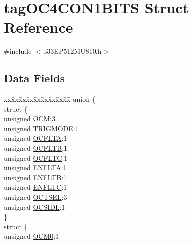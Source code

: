 \hypertarget{structtag_o_c4_c_o_n1_b_i_t_s}{}\section{tag\+O\+C4\+C\+O\+N1\+B\+I\+TS Struct Reference}
\label{structtag_o_c4_c_o_n1_b_i_t_s}


{\ttfamily \#include $<$p33\+E\+P512\+M\+U810.\+h$>$}

\subsection*{Data Fields}
\begin{DoxyCompactItemize}
\item 
\begin{tabbing}
xx\=xx\=xx\=xx\=xx\=xx\=xx\=xx\=xx\=\kill
union \{\\
\>struct \{\\
\>\>unsigned \hyperlink{structtag_o_c4_c_o_n1_b_i_t_s_a778fa0cf51a9477ac4e82d71a8733801}{OCM}:3\\
\>\>unsigned \hyperlink{structtag_o_c4_c_o_n1_b_i_t_s_a7a0057e0dca6e2663584b5b9e1da04c3}{TRIGMODE}:1\\
\>\>unsigned \hyperlink{structtag_o_c4_c_o_n1_b_i_t_s_acc967e41cecdeedc6ad4422f9ef1a6a3}{OCFLTA}:1\\
\>\>unsigned \hyperlink{structtag_o_c4_c_o_n1_b_i_t_s_a1fb30bb4421ef7c4bd0c66c379875593}{OCFLTB}:1\\
\>\>unsigned \hyperlink{structtag_o_c4_c_o_n1_b_i_t_s_a69a1772a4144abd579d17d28445b9934}{OCFLTC}:1\\
\>\>unsigned \hyperlink{structtag_o_c4_c_o_n1_b_i_t_s_a1e0f05fb23d516e003e4713fe8c1498a}{ENFLTA}:1\\
\>\>unsigned \hyperlink{structtag_o_c4_c_o_n1_b_i_t_s_a9d7aa97d5328b8b81ab7fd9145dfa0fc}{ENFLTB}:1\\
\>\>unsigned \hyperlink{structtag_o_c4_c_o_n1_b_i_t_s_a0b6f25c0f83f33b5501b6a2e6141a6ef}{ENFLTC}:1\\
\>\>unsigned \hyperlink{structtag_o_c4_c_o_n1_b_i_t_s_ae37d2a41dae2d2af1d82f7caae33cadb}{OCTSEL}:3\\
\>\>unsigned \hyperlink{structtag_o_c4_c_o_n1_b_i_t_s_afd05f4f249db4ef69b684e2f3fa6b703}{OCSIDL}:1\\
\>\} \\
\>struct \{\\
\>\>unsigned \hyperlink{structtag_o_c4_c_o_n1_b_i_t_s_a9271e84c9759ff10a7bc1cee3276e8f6}{OCM0}:1\\

\end{tabbing}
\end{DoxyCompactItemize}
